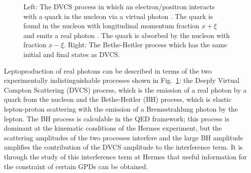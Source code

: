 \begin{figure}
\begin{center}
\hspace{3cm}
\caption[DVCS and Bethe Heitler hand bag diagram.]{Left: The DVCS process in
which an electron/positron  interacts with a quark in the nucleon  via a virtual photon \blue{($\gamma^\ast$)}. The quark is found in the nucleon with longitudinal momentum fraction $x+\xi$ and emits a real photon \blue{($\gamma$)}. The quark is absorbed by the nucleon with fraction $x-\xi$. Right: The Bethe-Heitler process which has the same initial and final states as DVCS.}
\label{spin}
\end{center}
\end{figure}

Leptoproduction of real photons  can be described in terms of the two experimentally indistinguishable processes shown in Fig.~\ref{spin}: the Deeply Virtual Compton Scattering (DVCS) process, which is the
emission of a real photon by a quark from the nucleon\blue{,} and the Bethe-Heitler (BH) process, which is elastic lepton-proton scattering with the
emission of a Bremsstrahlung photon by the lepton. 
The BH process is calculable in the QED framework; this process is
dominant at the kinematic conditions of the H{\sc ermes} experiment, but the
scattering amplitudes of the two processes interfere and the large BH amplitude
amplifies the contribution of the DVCS amplitude to the interference term. 
It is through the study of this interference term at H{\sc ermes} that
useful information for the constraint of certain GPDs can be obtained.

